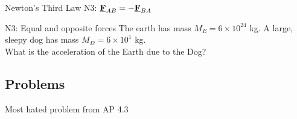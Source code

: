\begin{frame}{Newton's Third Law}
\small
N3: $\underline{\mathbf{F}}_{AB} = - \underline{\mathbf{F}}_{BA} $ \\[1ex]
\vspace{10cm}

\end{frame}

\begin{frame}{N3: Equal and opposite forces}
\small
The earth has mass $M_{E} = 6 \times 10^{24}$ kg. A large, sleepy dog has mass $M_{D} = 6\times10^1$ kg.\\[1ex]

What is the acceleration of the Earth due to the Dog?\\[1ex]

\vspace{10cm}

\end{frame}







\subsection{Problems}

 \begin{frame}{Most hated problem from AP 4.3}
\small


\end{frame}

